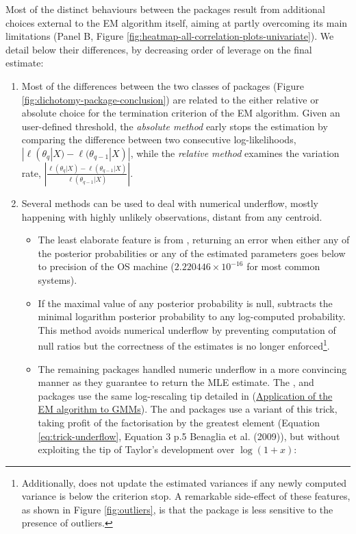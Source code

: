 Most of the distinct behaviours between the packages result from additional choices external to the EM algorithm itself, aiming at partly overcoming its main limitations (Panel B, Figure \ref{fig:heatmap-all-correlation-plots-univariate}). We detail below their differences, by decreasing order of leverage on the final estimate:

\begin{enumerate}
\def\labelenumi{\arabic{enumi}.}
\tightlist
\item
  Most of the differences between the two classes of packages (Figure \ref{fig:dichotomy-package-conclusion}) are
  related to the either relative or absolute choice for the termination criterion of the EM algorithm. Given an user-defined threshold, the \emph{absolute method} early stops the estimation by comparing the difference between two consecutive log-likelihoods, \(|\ell(\theta_{q}|X) - \ell(\theta_{q-1}|X)|\), while the \emph{relative method} examines the variation rate, \(\left\lvert\frac{\ell(\theta_{q}|X) - \ell(\theta_{q-1}|X)}{\ell(\theta_{q-1}|X)}\right\lvert\).
\item
  Several methods can be used to deal with numerical underflow, mostly happening with highly unlikely observations, distant from any centroid.

  \begin{itemize}
  \item
    The least elaborate feature is from , returning an error when either any of the posterior probabilities or any of the estimated parameters goes below to precision of the OS machine (\ensuremath{2.220446\times 10^{-16}} for most common systems).
  \item
    If the maximal value of any posterior probability is null,  subtracts the minimal logarithm posterior probability to any log-computed probability. This method avoids numerical
    underflow by preventing computation of null ratios but the correctness of the estimates is no longer enforced\footnote{Additionally,  does
      not update the estimated variances if any newly computed variance is
      below the criterion stop. A remarkable side-effect of these features, as
      shown in Figure \ref{fig:outliers}, is that the  package is
      less sensitive to the presence of outliers.}.
  \item
    The remaining packages handled numeric underflow in a more convincing
    manner as they guarantee to return the MLE estimate. The ,  and 
    packages use the same log-rescaling tip detailed in (\protect\hyperlink{application-of-the-em-algorithm-to-gmms}{Application of the EM algorithm to GMMs}). The  and
     packages use a variant of this trick, taking profit of the factorisation
    by the greatest element (Equation \eqref{eq:trick-underflow}, Equation 3 p.5 Benaglia et al. (2009)), but without exploiting the tip of Taylor's development over \(\log(1+x)\):
  \end{itemize}
\end{enumerate}

